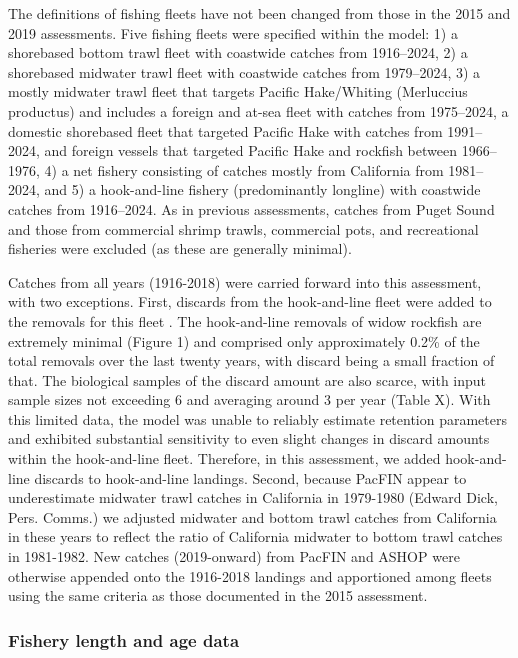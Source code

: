 \documentclass[
]{scrartcl}
\begin{document}
The definitions of fishing fleets have not been changed from those in
the 2015 and 2019 assessments. Five fishing fleets were specified within
the model: 1) a shorebased bottom trawl fleet with coastwide catches
from 1916--2024, 2) a shorebased midwater trawl fleet with coastwide
catches from 1979--2024, 3) a mostly midwater trawl fleet that targets
Pacific Hake/Whiting (Merluccius productus) and includes a foreign and
at-sea fleet with catches from 1975--2024, a domestic shorebased fleet
that targeted Pacific Hake with catches from 1991--2024, and foreign
vessels that targeted Pacific Hake and rockfish between 1966--1976, 4) a
net fishery consisting of catches mostly from California from
1981--2024, and 5) a hook-and-line fishery (predominantly longline) with
coastwide catches from 1916--2024. As in previous assessments, catches
from Puget Sound and those from commercial shrimp trawls, commercial
pots, and recreational fisheries were excluded (as these are generally
minimal).

Catches from all years (1916-2018) were carried forward into this
assessment, with two exceptions. First, discards from the hook-and-line
fleet were added to the removals for this fleet . The hook-and-line
removals of widow rockfish are extremely minimal (Figure 1) and
comprised only approximately 0.2\% of the total removals over the last
twenty years, with discard being a small fraction of that. The
biological samples of the discard amount are also scarce, with input
sample sizes not exceeding 6 and averaging around 3 per year (Table X).
With this limited data, the model was unable to reliably estimate
retention parameters and exhibited substantial sensitivity to even
slight changes in discard amounts within the hook-and-line fleet.
Therefore, in this assessment, we added hook-and-line discards to
hook-and-line landings. Second, because PacFIN appear to underestimate
midwater trawl catches in California in 1979-1980 (Edward Dick, Pers.
Comms.) we adjusted midwater and bottom trawl catches from California in
these years to reflect the ratio of California midwater to bottom trawl
catches in 1981-1982. New catches (2019-onward) from PacFIN and ASHOP
were otherwise appended onto the 1916-2018 landings and apportioned
among fleets using the same criteria as those documented in the 2015
assessment.

\subsubsection{Fishery length and age
data}\label{fishery-length-and-age-data}
\end{document}
